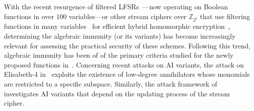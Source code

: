 \documentclass[11pt]{llncs}
\begin{document}
%
With the recent resurgence of filtered LFSRs~\cite{eprint:nostalgia,eprint:CarSar25}—now operating on Boolean functions in over $100$ variables—or other stream ciphers over $\mathbb{Z}_{2^t}$ that use filtering functions in many variables~\cite{AC:CHMS22,Indo:HofMeaSta23} for efficient hybrid homomorphic encryption~\cite{EPRINT:LauNaeVai11}, determining the algebraic immunity (or its variants) has become increasingly relevant for assessing the practical security of these schemes.
Following this trend, algebraic immunity has been of of the primary criteria studied for the newly proposed functions in~\cite{eprint:CarSar23,eprint:MeaSeuTan24,eprint:Meaux25}.
Concerning recent attacks on AI variants, the attack on Elisabeth-4 in~\cite{AC:GHJR23} exploits the existence of low-degree annihilators whose monomials are restricted to a specific subspace.
Similarly, the attack framework of~\cite{CIC:MeauxWang25} investigates AI variants that depend on the updating process of the stream cipher.
\end{document}

